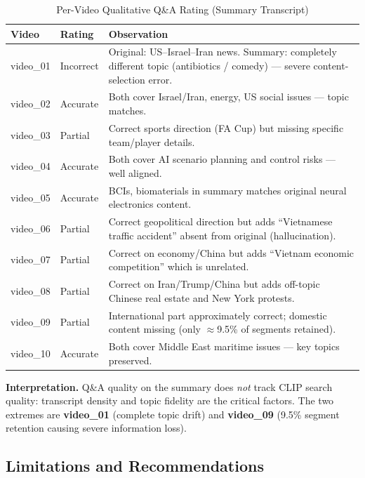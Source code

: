 \documentclass[10pt,conference]{IEEEtran}
\begin{document}
\begin{table}[H]
\centering
\caption{Per-Video Qualitative Q\&A Rating (Summary Transcript)}
\label{tab:qa_detail}
\begin{tabular}{p{1.1cm}p{1.3cm}p{5.0cm}}
\toprule
\textbf{Video} & \textbf{Rating} & \textbf{Observation} \\
\midrule
video\_01 & Incorrect
  & Original: US--Israel--Iran news. Summary: completely different topic
    (antibiotics / comedy) --- severe content-selection error. \\
video\_02 & Accurate
  & Both cover Israel/Iran, energy, US social issues --- topic matches. \\
video\_03 & Partial
  & Correct sports direction (FA Cup) but missing specific team/player
    details. \\
video\_04 & Accurate
  & Both cover AI scenario planning and control risks --- well aligned. \\
video\_05 & Accurate
  & BCIs, biomaterials in summary matches original neural electronics
    content. \\
video\_06 & Partial
  & Correct geopolitical direction but adds ``Vietnamese traffic accident''
    absent from original (hallucination). \\
video\_07 & Partial
  & Correct on economy/China but adds ``Vietnam economic competition''
    which is unrelated. \\
video\_08 & Partial
  & Correct on Iran/Trump/China but adds off-topic Chinese real estate
    and New York protests. \\
video\_09 & Partial
  & International part approximately correct; domestic content missing
    (only $\approx$9.5\% of segments retained). \\
video\_10 & Accurate
  & Both cover Middle East maritime issues --- key topics preserved. \\
\bottomrule
\end{tabular}
\end{table}

\textbf{Interpretation.} Q\&A quality on the summary does \emph{not} track
CLIP search quality: transcript density and topic fidelity are the critical
factors. The two extremes are \textbf{video\_01} (complete topic drift) and
\textbf{video\_09} (9.5\% segment retention causing severe information loss).

\subsection{Limitations and Recommendations}
\end{document}
